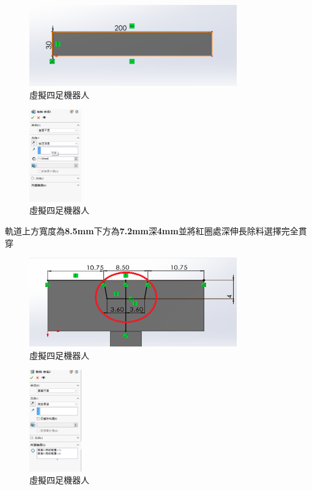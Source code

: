 \begin{figure}[h!]
    \centering
    \includegraphics[width=0.8\textwidth]{./../images/6-1-11.png}
    \caption{\Large 虛擬四足機器人}
    \end{figure}
\begin{figure}[h!]
    \includegraphics[width=0.2\textwidth]{./../images/6-1-12.png}
    \caption{\Large 虛擬四足機器人}
\end{figure}

\noindent 軌道上方寬度為\textbf{8.5mm}下方為\textbf{7.2mm}深\textbf{4mm}並將紅圈處深伸長除料選擇完全貫穿

\begin{figure}[h!]
    \centering
    \includegraphics[width=0.8\textwidth]{./../images/6-1-13.png}
    \caption{\Large 虛擬四足機器人}
\end{figure}

\begin{figure}[h!]
    \includegraphics[width=0.2\textwidth]{./../images/6-1-14.png}
    \caption{\Large 虛擬四足機器人}
\end{figure}

